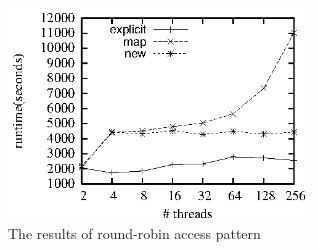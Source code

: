 \documentclass[preprint]{sigplanconf}
\begin{document}
\begin{figure}[ht!]
  \centering
  \includegraphics[width=80mm]{fig/rr.eps}
  \caption{The results of round-robin access pattern}
  \label{fig:rr_eval}
\end{figure}

\end{document}
